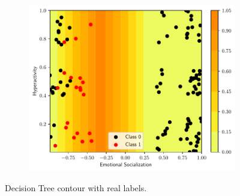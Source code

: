 \begin{figure}
\begin{subfigure}[b]{0.32\textwidth}
    \centering \includegraphics[width=\textwidth]{figs/tree-contour-2-5.pdf}
    \caption{}
  \end{subfigure}
  \caption{Decision Tree contour with real labels.}
  \label{fig:dts}
\end{figure}

